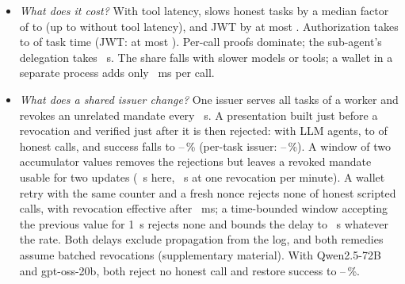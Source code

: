 \begin{itemize}
\item \emph{What does it cost?} With tool latency, \sys{} slows honest tasks by a median factor of \EFourSlowMin{} to \EFourSlowMax{} (up to \EFourSlowNoLatMax{} without tool latency), and JWT by at most \EFourJwtSlowMax{}. Authorization takes \EFourShareMin{} to \EFourShareMax{} of task time (JWT: at most \EFourJwtShareMax{}). Per-call proofs dominate; the sub-agent's delegation takes \EFourDelegS{}~s. The share falls with slower models or tools; a wallet in a separate process adds only \EFourIpcMs{}~ms per call.
\item \emph{What does a shared issuer change?} One issuer serves all tasks of a worker and revokes an unrelated mandate every \EFourShEvery{}~s. A presentation built just before a revocation and verified just after it is then rejected: with LLM agents, \EFourShRejMin{} to \EFourShRejMax{} of honest calls, and success falls to \EFourShSuccZeroMin{}--\EFourShSuccZeroMax{}\,\% (per-task issuer: \EFourShBaseMin{}--\EFourShBaseMax{}\,\%). A window of two accumulator values removes the rejections but leaves a revoked mandate usable for two updates (\EFourWtwoDelayS{}~s here, \EFourWtwoDelaySparseS{}~s at one revocation per minute). A wallet retry with the same counter and a fresh nonce rejects none of \EFourRetryCalls{} honest scripted calls, with revocation effective after \EFourRetryDelayMs{}~ms; a time-bounded window accepting the previous value for 1~s rejects none and bounds the delay to \EFourDeltaDelayS{}~s whatever the rate. Both delays exclude propagation from the log, and both remedies assume batched revocations (supplementary material). With Qwen2.5-72B and gpt-oss-20b, both reject no honest call and restore success to \EFourLlmFixSuccMin{}--\EFourLlmFixSuccMax{}\,\%.
\end{itemize}
